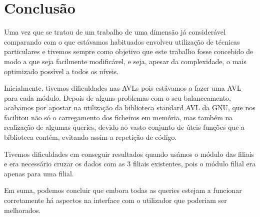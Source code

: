 \chapter{Conclusão}

Uma vez que se tratou de um trabalho de uma dimensão já considerável comparando com o que estávamos habituados envolveu utilização de técnicas particulares e tivemos sempre como objetivo que este trabalho fosse concebido de modo a que seja facilmente modificável, e seja, apesar da complexidade, o mais optimizado possível a todos os níveis.

Inicialmente, tivemos dificuldades nas AVLs pois estávamos a fazer uma AVL para cada módulo. Depois de alguns problemas com o seu balanceamento, acabamos por apostar na utilização da biblioteca standard AVL da GNU, que nos facilitou não só o carregamento dos ficheiros em memória, mas também na realização de algumas queries, devido ao vasto conjunto de úteis funções que a biblioteca contém, evitando assim a repetição de código. 

Tivemos dificuldades em conseguir resultados quando usámos o módulo das filiais e era necessário cruzar os dados com as 3 filiais existentes,  pois o módulo filial era apenas para uma filial. 

Em suma, podemos concluir que embora todas as queries estejam a funcionar corretamente há aspectos na interface com o utilizador que poderiam ser melhorados. 

